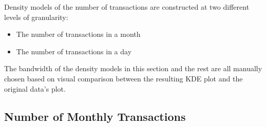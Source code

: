 \documentclass[11pt]{article}
\providecommand{\tightlist}{%
      \setlength{\itemsep}{0pt}\setlength{\parskip}{0pt}}
\begin{document}
Density models of the number of transactions are constructed at two
different levels of granularity:

\begin{itemize}
\tightlist
\item
  The number of transactions in a month
\item
  The number of transactions in a day
\end{itemize}

The bandwidth of the density models in this section and the rest are all
manually chosen based on visual comparison between the resulting KDE
plot and the original data's plot.

\subsection{Number of Monthly Transactions}
\end{document}
